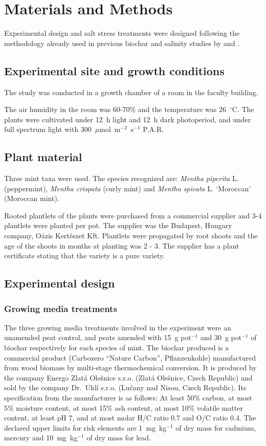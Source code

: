 \chapter{Materials and Methods}

Experimental design and salt stress treatments were designed following the methodology already used in previous biochar and salinity studies by \textcite{Akhtar2021} and \textcite{Hasanuzzaman2021}.

\section{Experimental site and growth conditions}

The study was conducted in a growth chamber of a room in the faculty building.

The air humidity in the room was 60-70\% and the temperature was 26~$^{\circ}$C. The plants were cultivated under 12~h light and 12~h dark photoperiod, and under full spectrum light with 300~$\mu$mol~m$^{-2}$~s$^{-1}$ P.A.R.

\section{Plant material}

Three mint taxa were used. The species recognized are: \textit{Mentha piperita} L. (peppermint), \textit{Mentha crispata} (curly mint) and \textit{Mentha spicata} L. `Moroccan' (Moroccan mint).

Rooted plantlets of the plants were purchased from a commercial supplier and 3-4 plantlets were planted per pot. The supplier was the Budapest, Hungary company, Oázis Kertészet Kft. Plantlets were propagated by root shoots and the age of the shoots in months at planting was 2 - 3. The supplier has a plant certificate stating that the variety is a pure variety.

\section{Experimental design}

\subsection{Growing media treatments}

The three growing media treatments involved in the experiment were an unamended peat control, and peats amended with 15~g pot$^{-1}$ and 30~g pot$^{-1}$ of biochar respectively for each species of mint. The biochar produced is a commercial product (Carbozero ``Nature Carbon'', Pflanzenkohle) manufactured from wood biomass by multi-stage thermochemical conversion. It is produced by the company Energo Zlatá Olešnice s.r.o. (Zlatá Olešnice, Czech Republic) and sold by the company Dr.~Uhlí s.r.o. (Lučany nad Nisou, Czech Republic). Its specification from the manufacturer is as follows: At least 50\% carbon, at most 5\% moisture content, at most 15\% ash content, at most 10\% volatile matter content, at least pH 7, and at most molar H/C ratio 0.7 and O/C ratio 0.4. The declared upper limits for risk elements are 1~mg~kg$^{-1}$ of dry mass for cadmium, mercury and 10~mg~kg$^{-1}$ of dry mass for lead.

